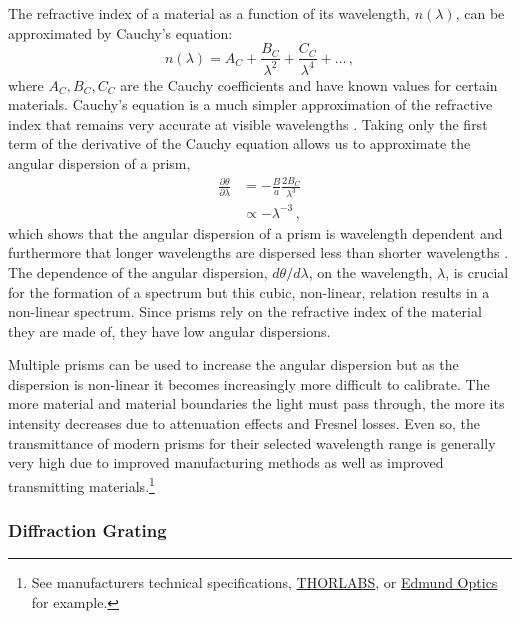 The refractive index of a material as a function of its wavelength, $n(\lambda)$, can be approximated by Cauchy's equation:
\begin{equation} \label{eq:Cauchy}
    n(\lambda) = A_{C} + \frac{B_{C}}{\lambda^{2}} + \frac{C_{C}}{\lambda^{4}} + \dots\,,
\end{equation}
where $A_{C}, B_{C}, C_{C}$ are the Cauchy coefficients and have known values for certain materials. Cauchy's equation is a much simpler approximation of the refractive index that remains very accurate at visible wavelengths \citep{JenkinsOptics}. Taking only the first term of the derivative of the Cauchy equation allows us to approximate the angular dispersion of a prism,
\begin{equation} \label{eq:prism_angular_dispersion_approx}
    \begin{aligned}
        \frac{\partial \theta}{\partial \lambda} &= -\frac{B}{a}\frac{2B_{C}}{\lambda^{3}}\\
        &\propto -\lambda^{-3}\,,
    \end{aligned}
\end{equation}
which shows that the angular dispersion of a prism is wavelength dependent and furthermore that longer wavelengths are dispersed less than shorter wavelengths \citep{BirneyObsAstro, Hecht_optics}. The dependence of the angular dispersion, $d\theta/d\lambda$, on the wavelength, $\lambda$, is crucial for the formation of a spectrum but this cubic, non-linear, relation results in a non-linear spectrum. Since prisms rely on the refractive index of the material they are made of, they have low angular dispersions.

Multiple prisms can be used to increase the angular dispersion but as the dispersion is non-linear it becomes increasingly more difficult to calibrate. The more material and material boundaries the light must pass through, the more its intensity decreases due to attenuation effects and Fresnel losses. Even so, the transmittance of modern prisms for their selected wavelength range is generally very high due to improved manufacturing methods as well as improved transmitting materials.\footnote{See manufacturers technical specifications, \href{https://www.thorlabs.com/newgrouppage9.cfm?objectgroup_id=148}{THORLABS}, or \href{https://www.edmundoptics.eu/c/prisms/607/}{Edmund Optics} for example.}
\enlargethispage{-2\baselineskip}

\subsubsection{Diffraction Grating} \label{subsubsec:diff_grat}

